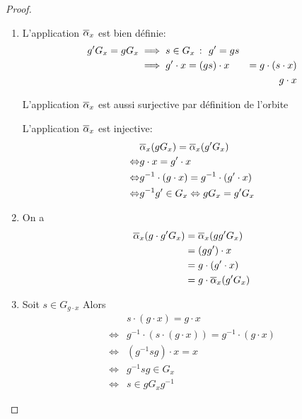 \begin{proof}\,
    \begin{enumerate}[label=(\roman*)] %
        \item L'application \({\overline{\alpha}}_x\) est bien définie:
        \begin{equation*}
            \begin{aligned}
                g'G_x = gG_x &\implies s\in G_x\ \colon\  g' = gs\\
                &\implies g'\cdot x = (gs)\cdot x &= g\cdot(s\cdot x)\\
                & & g\cdot x
            \end{aligned}
        \end{equation*}

        L'application \({\overline{\alpha}}_x\) est aussi surjective par
        définition de l'orbite

        L'application \({\overline{\alpha}}_x\) est injective:
        \begin{equation*}
            \begin{aligned}
                &{\overline{\alpha}}_x (gG_x) = {\overline{\alpha}}_x (g'G_x)\\
                \Leftrightarrow & g\cdot x = g'\cdot x\\
                \Leftrightarrow & g^{-1}\cdot(g\cdot x) = g^{-1} \cdot (g' \cdot x)\\
                \Leftrightarrow & g^{-1} g' \in G_x \Leftrightarrow gG_x = g'G_x
            \end{aligned}
        \end{equation*}

        \item On a
        \begin{equation*}
            \begin{aligned}
                {\overline{\alpha}}_x(g\cdot g'G_x) &= {\overline{\alpha}}_x (gg' G_x)\\
                &= (gg')\cdot x\\
                &= g\cdot (g'\cdot x)\\
                &= g\cdot {\overline{\alpha}}_x (g' G_x)
            \end{aligned}
        \end{equation*}

        \item Soit \(s\in G_{g\cdot x}\) Alors
        \begin{equation*}
            \begin{aligned}
                &s\cdot(g\cdot x) = g\cdot x\\
                \Leftrightarrow & g^{-1}\cdot(s\cdot(g\cdot x)) = g^{-1}\cdot (g\cdot x)\\
                \Leftrightarrow & (g^{-1}sg)\cdot x = x\\
                \Leftrightarrow & g^{-1}sg\in G_x\\
                \Leftrightarrow & s\in gG_x g^{-1}
            \end{aligned}
        \end{equation*}
    \end{enumerate}
\end{proof}


